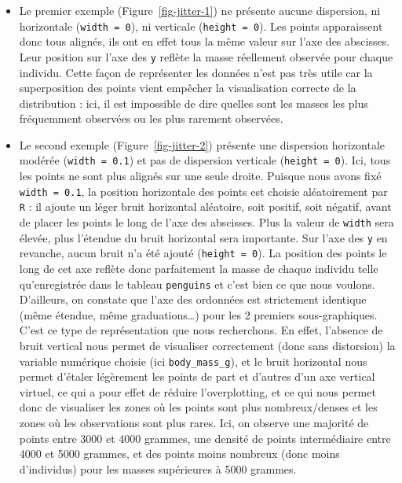 \documentclass[
  a4paper,
  DIV=11,
  numbers=noendperiod,
  oneside]{scrreprt}
\begin{document}
\begin{itemize}
\item
  Le premier exemple (Figure~\ref{fig-jitter-1}) ne présente aucune
  dispersion, ni horizontale (\texttt{width\ =\ 0}), ni verticale
  (\texttt{height\ =\ 0}). Les points apparaissent donc tous alignés,
  ils ont en effet tous la même valeur sur l'axe des abscisses. Leur
  position sur l'axe des \texttt{y} reflète la masse réellement observée
  pour chaque individu. Cette façon de représenter les données n'est pas
  très utile car la superposition des points vient empêcher la
  visualisation correcte de la distribution : ici, il est impossible de
  dire quelles sont les masses les plus fréquemment observées ou les
  plus rarement observées.
\item
  Le second exemple (Figure~\ref{fig-jitter-2}) présente une dispersion
  horizontale modérée (\texttt{width\ =\ 0.1}) et pas de dispersion
  verticale (\texttt{height\ =\ 0}). Ici, tous les points ne sont plus
  alignés sur une seule droite. Puisque nous avons fixé
  \texttt{width\ =\ 0.1}, la position horizontale des points est choisie
  aléatoirement par \texttt{R} : il ajoute un léger bruit horizontal
  aléatoire, soit positif, soit négatif, avant de placer les points le
  long de l'axe des abscisses. Plus la valeur de \texttt{width} sera
  élevée, plus l'étendue du bruit horizontal sera importante. Sur l'axe
  des \texttt{y} en revanche, aucun bruit n'a été ajouté
  (\texttt{height\ =\ 0}). La position des points le long de cet axe
  reflète donc parfaitement la masse de chaque individu telle
  qu'enregistrée dans le tableau \texttt{penguins} et c'est bien ce que
  nous voulons. D'ailleurs, on constate que l'axe des ordonnées est
  strictement identique (même étendue, même graduations\ldots) pour les
  2 premiers sous-graphiques. C'est ce type de représentation que nous
  recherchons. En effet, l'absence de bruit vertical nous permet de
  visualiser correctement (donc sans distorsion) la variable numérique
  choisie (ici \texttt{body\_mass\_g}), et le bruit horizontal nous
  permet d'étaler légèrement les points de part et d'autres d'un axe
  vertical virtuel, ce qui a pour effet de réduire l'overplotting, et ce
  qui nous permet donc de visualiser les zones où les points sont plus
  nombreux/denses et les zones où les observations sont plus rares. Ici,
  on observe une majorité de points entre 3000 et 4000 grammes, une
  densité de points intermédiaire entre 4000 et 5000 grammes, et des
  points moins nombreux (donc moins d'individus) pour les masses
  supérieures à 5000 grammes.

\end{itemize}
\end{document}
